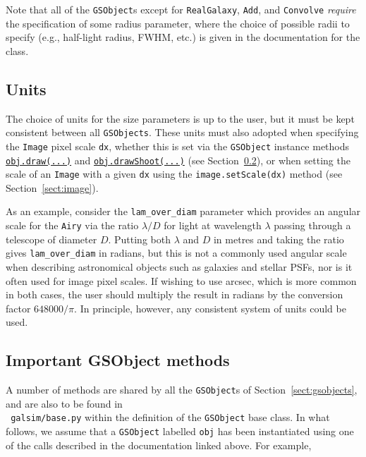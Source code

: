 \documentclass[preprint,11pt]{aastex}
\begin{document}
Note that all of the \texttt{GSObject}s except for \texttt{RealGalaxy}, \texttt{Add}, and
\texttt{Convolve} {\em require} the specification of some radius parameter, where the choice of
possible radii to specify (e.g., half-light radius, FWHM, etc.) is given in the documentation for
the class.

\subsection{Units}
The choice of units for the size parameters is up to the user,
but it must be kept consistent between all \texttt{GSObjects}.  These
units must also adopted when specifying the \texttt{Image} pixel
scale \texttt{dx}, whether this is set via the \texttt{GSObject}
instance methods \href{http://galsim-developers.github.com/GalSim/classgalsim_1_1base_1_1_g_s_object.html#ae0b346a8b438dedbc7f60a52220869d8}{\texttt{obj.draw(...)}}
and
\href{http://galsim-developers.github.com/GalSim/classgalsim_1_1base_1_1_g_s_object.html#a42ac334d2840ba3fa832988e998beca0}{\texttt{obj.drawShoot(...)}}
(see Section~\ref{sect:gsobjectmethods}),
or when setting the scale of an \texttt{Image} with a given
\texttt{dx} using the \texttt{image.setScale(dx)} method (see Section~\ref{sect:image}).

As an example, consider the
\texttt{lam\_over\_diam} parameter which provides an angular scale for
the \texttt{Airy} via
the ratio $\lambda / D$ for light at wavelength $\lambda$ passing
through a telescope of diameter $D$. Putting both $\lambda$ and
$D$ in metres and taking the ratio gives \texttt{lam\_over\_diam} in
radians, but this is not a commonly used angular scale when describing
astronomical objects such as galaxies and stellar PSFs, nor is
it often used for image pixel scales.  If wishing to use arcsec, which
is more common in both cases, the user should multiply the result in
radians by the conversion factor
$648000 / \pi$.  In principle, however, any consistent
system of units could be used.


\subsection{Important GSObject methods}\label{sect:gsobjectmethods}
A number of methods are shared by all the \texttt{GSObject}s of
Section~\ref{sect:gsobjects}, and are also to be found in \\ {\tt
 galsim/base.py} within the definition of the
\texttt{GSObject} base class.  In what follows, we assume that a
\texttt{GSObject} labelled \texttt{obj} has been instantiated using
one of the calls described in the documentation linked above.  For
example,
\end{document}

